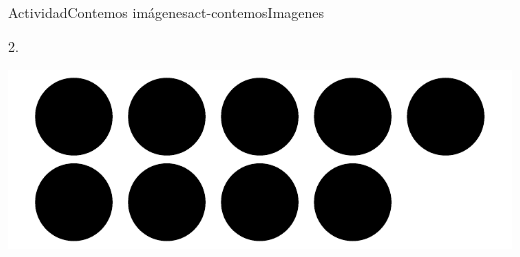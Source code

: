 \documentclass[20pt]{extarticle}
\begin{document}
\begin{activity}{Actividad}{Contemos imágenes}{act-contemosImagenes}
\begin{image}{0}{1}{0}{}
\end{image}%
2.%
\begin{image}{0}{1}{0}{}%
\includegraphics[max width=\linewidth, center]{external/svg-source/tikz-file-148270.pdf}
\end{image}%
\end{activity}
\end{document}
